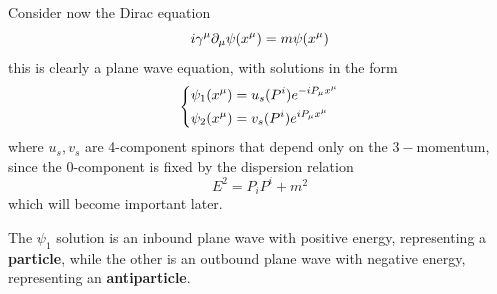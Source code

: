 Consider now the Dirac equation
$$i\gamma^\mu\partial_\mu\psi(x^\mu) = m\psi(x^\mu)$$
this is clearly a plane wave equation, with solutions in the form
$$\begin{dcases*}
    \psi_1(x^\mu) = u_s(P^i) e^{-iP_\mu x^\mu}\\
    \psi_2(x^\mu) = v_s(P^i) e^{iP_\mu x^\mu}
\end{dcases*}
$$
where $u_s,v_s$ are 4-component spinors that depend only on the $3-$momentum, since
the 0-component is fixed by the dispersion relation
$$E^2 = P_iP^i+m^2$$
which will become important later.

The $\psi_1$ solution is an inbound plane wave with positive energy,
representing a \textbf{particle}, while the other is an outbound
plane wave with negative energy, representing an \textbf{antiparticle}.

